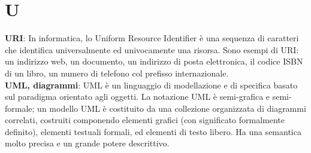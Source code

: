 \section{U}
\textbf{URI}: In informatica, lo Uniform Resource Identifier è una sequenza di caratteri che identifica universalmente ed univocamente una risorsa. Sono esempi di URI: un indirizzo web, un documento, un indirizzo di posta elettronica, il codice ISBN di un libro, un numero di telefono col prefisso internazionale.\\
\textbf{UML, diagrammi}: UML è un linguaggio di modellazione e di specifica basato sul paradigma orientato agli oggetti.
 La notazione UML è semi-grafica e semi-formale; un modello UML è costituito da una collezione organizzata di diagrammi correlati, costruiti componendo elementi grafici (con significato
formalmente definito), elementi testuali formali, ed elementi di testo libero. Ha una semantica molto
precisa e un grande potere descrittivo.\\
